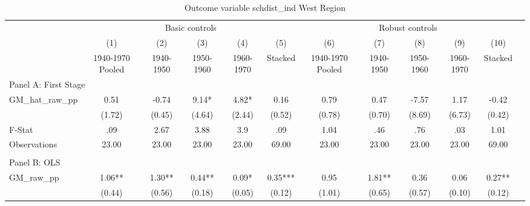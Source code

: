  \begin{table}[htbp]\centering {} \begin{threeparttable} \caption{Outcome variable schdist\_ind West Region} \begin{tabular}{l*{11}{c}} \toprule
          &\multicolumn{5}{c}{Basic controls}                                   &\multicolumn{5}{c}{Robust controls}                                  \\\cmidrule(lr){2-6}\cmidrule(lr){7-11}
          &\multicolumn{1}{c}{(1)}&\multicolumn{1}{c}{(2)}&\multicolumn{1}{c}{(3)}&\multicolumn{1}{c}{(4)}&\multicolumn{1}{c}{(5)}&\multicolumn{1}{c}{(6)}&\multicolumn{1}{c}{(7)}&\multicolumn{1}{c}{(8)}&\multicolumn{1}{c}{(9)}&\multicolumn{1}{c}{(10)}\\
          &\multicolumn{1}{c}{1940-1970 Pooled}&\multicolumn{1}{c}{1940-1950}&\multicolumn{1}{c}{1950-1960}&\multicolumn{1}{c}{1960-1970}&\multicolumn{1}{c}{Stacked}&\multicolumn{1}{c}{1940-1970 Pooled}&\multicolumn{1}{c}{1940-1950}&\multicolumn{1}{c}{1950-1960}&\multicolumn{1}{c}{1960-1970}&\multicolumn{1}{c}{Stacked}\\
\cmidrule(lr){1-11}
\multicolumn{10}{l}{Panel A: First Stage}\\
\cmidrule(lr){1-11}
GM\_hat\_raw\_pp&      0.51   &     -0.74   &      9.14*  &      4.82*  &      0.16   &      0.79   &      0.47   &     -7.57   &      1.17   &     -0.42   \\
          &    (1.72)   &    (0.45)   &    (4.64)   &    (2.44)   &    (0.52)   &    (0.78)   &    (0.70)   &    (8.69)   &    (6.73)   &    (0.42)   \\
\midrule
F-Stat    &       .09   &      2.67   &      3.88   &       3.9   &       .09   &      1.04   &       .46   &       .76   &       .03   &      1.01   \\
Observations&     23.00   &     23.00   &     23.00   &     23.00   &     69.00   &     23.00   &     23.00   &     23.00   &     23.00   &     69.00   \\
\cmidrule[\heavyrulewidth](lr){1-11} \\ \cmidrule[\heavyrulewidth](lr){1-11}
\multicolumn{10}{l}{Panel B: OLS}\\
\cmidrule(lr){1-11}
GM\_raw\_pp &      1.06** &      1.30** &      0.44** &      0.09*  &      0.35***&      0.95   &      1.81** &      0.36   &      0.06   &      0.27** \\
          &    (0.44)   &    (0.56)   &    (0.18)   &    (0.05)   &    (0.12)   &    (1.01)   &    (0.65)   &    (0.57)   &    (0.10)   &    (0.12)   \\

\end{tabular}
\end{threeparttable}
\end{table}
